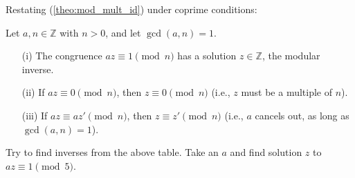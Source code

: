 \noindent
Restating (\ref{theo:mod_mult_id}) under coprime conditions:
\begin{theo}
    
    \label{theo:co_mod_mult_id}
    
    Let \(a, n \in \mathbb{Z}\) with \(n > 0\), and let \(\gcd(a, n) = 1\).
    \begin{itemize}
        \item[(i)] The congruence \(az \equiv 1 \pmod{n}\) has a solution \(z \in \mathbb{Z}\), the modular inverse.
        
        \item[(ii)] If \(az \equiv 0 \pmod{n}\), then \(z \equiv 0 \pmod{n}\) (i.e., \(z\) must be a multiple of \(n\)).
        
        \item[(iii)] If \(az \equiv az' \pmod{n}\), then \(z \equiv z' \pmod{n}\) (i.e., \(a\) cancels out, as long as \(\gcd(a, n) = 1\)).
    \end{itemize}
  
\end{theo}

\noindent
Try to find inverses from the above table. Take an $a$ and find solution $z$ to $az\equiv1\pmod{5}$.

\newpage









